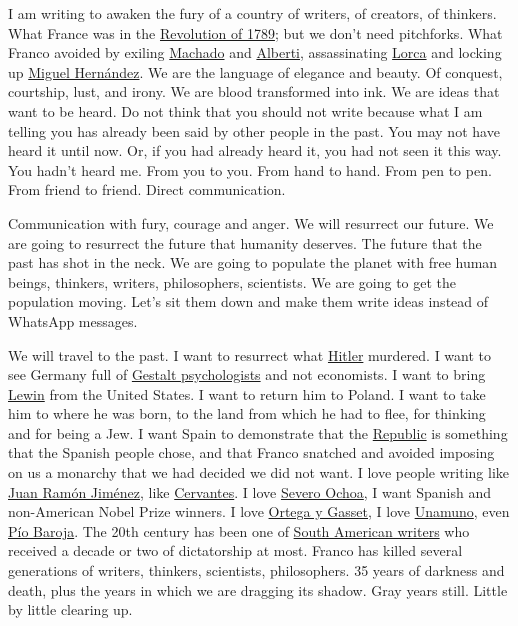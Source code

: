 \documentclass[]{book}
\begin{document}
I am writing to awaken the fury of a country of writers, of creators, of thinkers. What France was in the \href{https://en.wikipedia.org/wiki/French_Revolution}{Revolution of 1789}; but we don't need pitchforks. What Franco avoided by exiling \href{https://en.wikipedia.org/wiki/Antonio_Machado}{Machado} and \href{https://en.wikipedia.org/wiki/Rafael_Alberti}{Alberti}, assassinating \href{https://en.wikipedia.org/wiki/Federico_Garc\%C3\%ADa_Lorca}{Lorca} and locking up \href{https://en.wikipedia.org/wiki/Miguel_Hern\%C3\%A1ndez}{Miguel Hernández}. We are the language of elegance and beauty. Of conquest, courtship, lust, and irony. We are blood transformed into ink. We are ideas that want to be heard. Do not think that you should not write because what I am telling you has already been said by other people in the past. You may not have heard it until now. Or, if you had already heard it, you had not seen it this way. You hadn't heard me. From you to you. From hand to hand. From pen to pen. From friend to friend. Direct communication.

Communication with fury, courage and anger. We will resurrect our future. We are going to resurrect the future that humanity deserves. The future that the past has shot in the neck. We are going to populate the planet with free human beings, thinkers, writers, philosophers, scientists. We are going to get the population moving. Let's sit them down and make them write ideas instead of WhatsApp messages.

We will travel to the past. I want to resurrect what \href{https://en.wikipedia.org/wiki/Adolf_Hitler}{Hitler} murdered. I want to see Germany full of \href{https://en.wikipedia.org/wiki/Gestalt_psychology}{Gestalt psychologists} and not economists. I want to bring \href{https://en.wikipedia.org/wiki/Kurt_Lewin}{Lewin} from the United States. I want to return him to Poland. I want to take him to where he was born, to the land from which he had to flee, for thinking and for being a Jew. I want Spain to demonstrate that the \href{https://en.wikipedia.org/wiki/Second_Spanish_Republic}{Republic} is something that the Spanish people chose, and that Franco snatched and avoided imposing on us a monarchy that we had decided we did not want. I love people writing like \href{https://en.wikipedia.org/wiki/Juan_Ram\%C3\%B3n_Jim\%C3\%A9nez}{Juan Ramón Jiménez}, like \href{https://en.wikipedia.org/wiki/Juan_Ram\%C3\%B3n_Jim\%C3\%A9nez}{Cervantes}. I love \href{https://en.wikipedia.org/wiki/Severo_Ochoa}{Severo Ochoa}, I want Spanish and non-American Nobel Prize winners. I love \href{https://en.wikipedia.org/wiki/Jos\%C3\%A9_Ortega_y_Gasset}{Ortega y Gasset}, I love \href{https://en.wikipedia.org/wiki/Miguel_de_Unamuno}{Unamuno}, even \href{https://en.wikipedia.org/wiki/P\%C3\%ADo_Baroja}{Pío Baroja}. The 20th century has been one of \href{https://en.wikipedia.org/wiki/Latin_American_literature\#The_Boom}{South American writers} who received a decade or two of dictatorship at most. Franco has killed several generations of writers, thinkers, scientists, philosophers. 35 years of darkness and death, plus the years in which we are dragging its shadow. Gray years still. Little by little clearing up.
\end{document}
